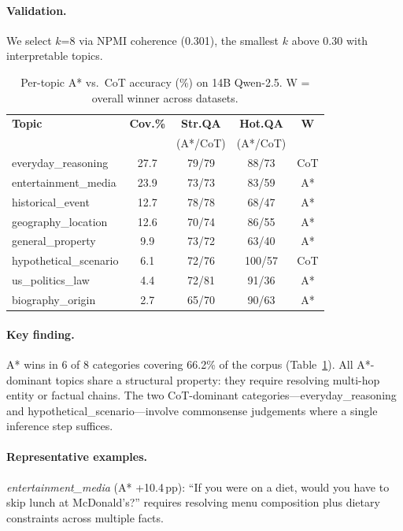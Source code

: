 \documentclass[11pt]{article}
\begin{document}
\paragraph{Validation.} We select $k$=8 via NPMI coherence (0.301), the smallest $k$ above 0.30 with interpretable topics.

\begin{table}[h]
\centering
\small
\setlength{\tabcolsep}{3pt}
\begin{tabular}{lcccc}
\toprule
\textbf{Topic} & \textbf{Cov.\%} & \textbf{Str.QA} & \textbf{Hot.QA} & \textbf{W} \\
& & (A*/CoT) & (A*/CoT) & \\
\midrule
everyday\_reasoning & 27.7 & 79/79 & 88/73 & CoT \\
entertainment\_media & 23.9 & 73/73 & 83/59 & A* \\
historical\_event & 12.7 & 78/78 & 68/47 & A* \\
geography\_location & 12.6 & 70/74 & 86/55 & A* \\
general\_property & 9.9 & 73/72 & 63/40 & A* \\
hypothetical\_scenario & 6.1 & 72/76 & 100/57 & CoT \\
us\_politics\_law & 4.4 & 72/81 & 91/36 & A* \\
biography\_origin & 2.7 & 65/70 & 90/63 & A* \\
\bottomrule
\end{tabular}
\caption{Per-topic A* vs.\ CoT accuracy (\%) on 14B Qwen-2.5. W = overall winner across datasets.}
\label{tab:topic_results}
\end{table}

\paragraph{Key finding.} A* wins in 6 of 8 categories covering 66.2\% of the corpus (Table~\ref{tab:topic_results}). All A*-dominant topics share a structural property: they require resolving multi-hop entity or factual chains. The two CoT-dominant categories---everyday\_reasoning and hypothetical\_scenario---involve commonsense judgements where a single inference step suffices.

\paragraph{Representative examples.}
\emph{entertainment\_media} (A* +10.4\,pp): ``If you were on a diet, would you have to skip lunch at McDonald's?'' requires resolving menu composition plus dietary constraints across multiple facts.
\end{document}
